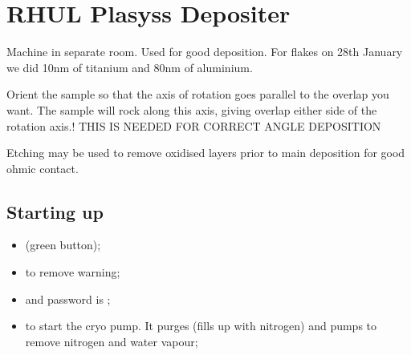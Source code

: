 

\section{RHUL Plasyss Depositer\label{sec:plassys}}
Machine in  separate room.  Used  for good deposition. For  flakes on
28th January we did 10nm of titanium and 80nm of aluminium.

\begin{framed}\noindent
  Orient the sample so that the axis of rotation goes parallel to the
  overlap you  want.  The  sample will rock  along this  axis, giving
  overlap  either side  of the  rotation axis.!   THIS IS  NEEDED FOR
  CORRECT ANGLE DEPOSITION

  Etching  may  be used  to  remove  oxidised  layers prior  to  main
  deposition for good ohmic contact.
\end{framed}

\subsection{Starting up}
\begin{itemize}
\item  {} (green button);
\item {} to remove warning;
\item   {}   and   password   is
  ;
\item  {} to  start the  cryo
  pump.   It purges  (fills up  with  nitrogen) and  pumps to  remove
  nitrogen and water vapour;
\end{itemize}
